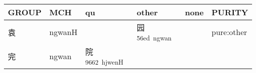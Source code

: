 \documentclass[14pt,a4paper]{scrartcl}
\begin{document}
\begin{longtable}[c]{@{}llllll@{}}
\toprule
\begin{minipage}[b]{0.14\columnwidth}\raggedright\strut
GROUP
\strut\end{minipage} &
\begin{minipage}[b]{0.14\columnwidth}\raggedright\strut
MCH
\strut\end{minipage} &
\begin{minipage}[b]{0.14\columnwidth}\raggedright\strut
qu
\strut\end{minipage} &
\begin{minipage}[b]{0.14\columnwidth}\raggedright\strut
other
\strut\end{minipage} &
\begin{minipage}[b]{0.14\columnwidth}\raggedright\strut
none
\strut\end{minipage} &
\begin{minipage}[b]{0.14\columnwidth}\raggedright\strut
PURITY
\strut\end{minipage}\tabularnewline
\midrule
\endhead
\begin{minipage}[t]{0.14\columnwidth}\raggedright\strut
袁
\strut\end{minipage} &
\begin{minipage}[t]{0.14\columnwidth}\raggedright\strut
ngwanH
\strut\end{minipage} &
\begin{minipage}[t]{0.14\columnwidth}\raggedright\strut
\strut\end{minipage} &
\begin{minipage}[t]{0.14\columnwidth}\raggedright\strut
园\textsuperscript{56ed~ngwan}
\strut\end{minipage} &
\begin{minipage}[t]{0.14\columnwidth}\raggedright\strut
\strut\end{minipage} &
\begin{minipage}[t]{0.14\columnwidth}\raggedright\strut
pure:other
\strut\end{minipage}\tabularnewline
\begin{minipage}[t]{0.14\columnwidth}\raggedright\strut
完
\strut\end{minipage} &
\begin{minipage}[t]{0.14\columnwidth}\raggedright\strut
ngwan
\strut\end{minipage} &
\begin{minipage}[t]{0.14\columnwidth}\raggedright\strut
院\textsuperscript{9662~hjwenH}
\strut\end{minipage} &

\end{longtable}
\end{document}
